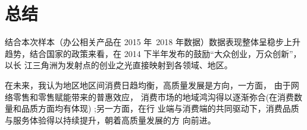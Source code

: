 \documentclass[a4paper]{ctexart}
\begin{document}
\section{总结}
结合本次样本（办公相关产品在 2015 年~2018 年数据）数据表现整体呈稳步上升
趋势，结合国家的政策来看，在 2014 下半年发布的鼓励“大众创业，万众创新”，以长
江三角洲为发射点的创业之光直接映射到各领域、地区。

在未来，我认为地区地区间消费日趋均衡，高质量发展是方向，一方面， 由于网络零售和零售赋能带来的普惠效应，
消费市场的地域鸿沟得以逐渐弥合(在消费数量和品质方面均有体现) ;另一方面，在行
业端与消费端的共同驱动下，消费品质与服务体验得以持续提升，朝着高质量发展的方
向前进。


\nocite{*}
\end{document}
